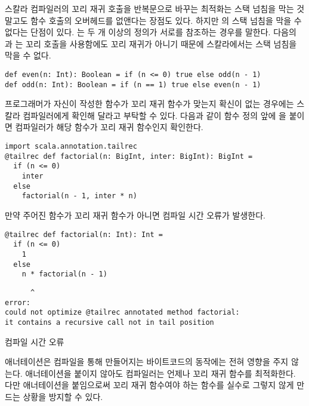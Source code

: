 스칼라 컴파일러의 꼬리 재귀 호출을 반복문으로 바꾸는 최적화는 스택 넘침을 막는
것 말고도 함수 호출의 오버헤드를 없앤다는 장점도 있다. 하지만
의 스택 넘침을 막을 수 없다는 단점이 있다.
는 두 개 이상의 정의가 서로를 참조하는 경우를 말한다.
다음의 과 는 꼬리 호출을 사용함에도 꼬리 재귀가 아니기 때문에
스칼라에서는 스택 넘침을 막을 수 없다.

\begin{verbatim}
def even(n: Int): Boolean = if (n <= 0) true else odd(n - 1)
def odd(n: Int): Boolean = if (n == 1) true else even(n - 1)
\end{verbatim}

프로그래머가 자신이 작성한 함수가 꼬리 재귀 함수가 맞는지 확신이 없는 경우에는
스칼라 컴파일러에게 확인해 달라고 부탁할 수 있다. 다음과 같이 함수 정의 앞에
을 붙이면 컴파일러가 해당 함수가 꼬리 재귀 함수인지
확인한다.

\begin{verbatim}
import scala.annotation.tailrec
@tailrec def factorial(n: BigInt, inter: BigInt): BigInt =
  if (n <= 0)
    inter
  else
    factorial(n - 1, inter * n)
\end{verbatim}

만약 주어진 함수가 꼬리 재귀 함수가 아니면 컴파일 시간 오류가 발생한다.

\begin{verbatim}
@tailrec def factorial(n: Int): Int =
  if (n <= 0)
    1
  else
    n * factorial(n - 1)
\end{verbatim}
\vspace{-1em}
\begin{mdframed}[hidealllines=true,backgroundcolor=gray!10,innerleftmargin=3pt,innerrightmargin=3pt,leftmargin=-3pt,rightmargin=-3pt]
\begin{verbatim}
      ^
error:
could not optimize @tailrec annotated method factorial:
it contains a recursive call not in tail position
\end{verbatim}
\vspace{-1.5em}
\begin{flushright}
\scriptsize\textsf{컴파일 시간 오류}
\end{flushright}
\end{mdframed}

애너테이션은 컴파일을 통해 만들어지는 바이트코드의 동작에는 전혀 영향을 주지
않는다. 애너테이션을 붙이지 않아도 컴파일러는 언제나 꼬리 재귀 함수를
최적화한다. 다만 애너테이션을 붙임으로써 꼬리 재귀 함수여야 하는 함수를 실수로
그렇지 않게 만드는 상황을 방지할 수 있다.

